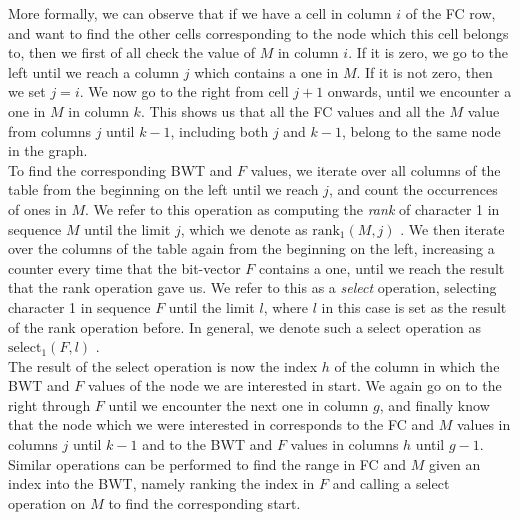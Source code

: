 \documentclass[a4paper,12pt,twoside,BCOR=10mm]{scrbook}
\begin{document}
More formally, we can observe that
if we have a cell in column $ i $ of the FC row, and want to find the other cells corresponding to
the node which this cell belongs to, then we first of all check the value of $ M $ in column $ i $.
If it is zero, we go to the left until we reach a column $ j $ which contains a one in $ M $.
If it is not zero, then we set $ j = i $.
We now go to the right from cell $ j + 1 $ onwards, until we encounter a one in $ M $ in column $ k $.
This shows us that all the FC values and all the $ M $ value
from columns $ j $ until $ k - 1 $, including both $ j $ and $ k - 1 $,
belong to the same node in the graph. \\
To find the corresponding BWT and $ F $ values, we iterate over all columns of the table from the beginning on
the left until we reach $ j $, and count the occurrences of ones in $ M $.
We refer to this operation as computing the \textit{rank} of character 1 in sequence $ M $ until the limit $ j $,
which we denote as $ \textrm{rank}_1 ( M, j ) $ \citep{Siren2009}.\label{def:rank}
We then iterate over the columns of the table again from the beginning on the left,
increasing a counter every time that the bit-vector $ F $ contains a one, until we reach
the result that the rank operation gave us.
We refer to this as a \textit{select} operation, selecting character 1 in sequence $ F $ until the limit $ l $,
where $ l $ in this case is set as the result of the rank operation before. In general,
we denote such a select operation as $ \textrm{select}_1 ( F, l ) $ \citep{Siren2009}.\label{def:select} \\
The result of the select operation is now the index $ h $ of the column in which the BWT and $ F $ values
of the node we are interested in start.
We again go on to the right through $ F $ until we encounter the next one in column $ g $,
and finally know that the node which we were interested in corresponds to the
FC and $ M $ values in columns $ j $ until $ k - 1 $ and to the BWT and $ F $ values in columns $ h $ until $ g - 1 $. \\
Similar operations can be performed to find the range in FC and $ M $ given an index into the BWT,
namely ranking the index in $ F $ and calling a select operation on $ M $ to find the corresponding start.
\end{document}
